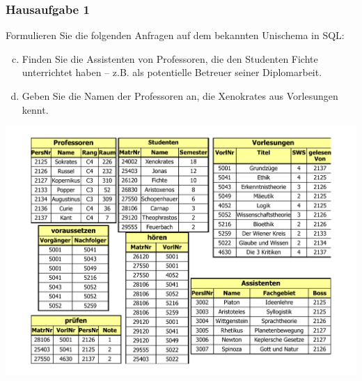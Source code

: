 \begin{frame}[fragile]
	\frametitle{Hausaufgabe 1}
	\vspace{0.25cm}

	\begin{multicols}{2}
		Formulieren Sie die folgenden Anfragen auf dem bekannten Unischema in SQL:
		\begin{enumerate}[a)]
			\setcounter{enumi}{2}
			\item Finden Sie die Assistenten von Professoren, die den Studenten Fichte unterrichtet haben – z.B. als potentielle Betreuer seiner Diplomarbeit.
			\item Geben Sie die Namen der Professoren an, die Xenokrates aus Vorlesungen kennt.
		\end{enumerate}
		\vfill\columnbreak

		\begin{center}
			\includegraphics[height=.6\paperheight]{../img/uni.pdf}
		\end{center}
	\end{multicols}
\end{frame}

